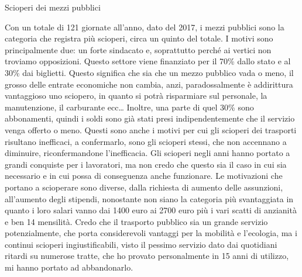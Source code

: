 \documentclass[12pt]{book} %
\begin{document}
\bigskip
\begin{mdframed}[linewidth=1pt]
Scioperi dei mezzi pubblici

Con un totale di 121 giornate all'anno, dato del 2017, i mezzi pubblici sono la categoria che
registra più scioperi, circa un quinto del totale. I motivi sono principalmente due: un forte sindacato e, soprattutto
perché ai vertici non troviamo opposizioni. Questo settore viene finanziato per il 70\% dallo stato e al 30\% dai
biglietti. Questo significa che sia che un mezzo pubblico vada o meno, il grosso delle entrate economiche non cambia,
anzi, paradossalmente è addirittura vantaggioso uno sciopero, in quanto si potrà risparmiare sul personale, la
manutenzione, il carburante ecc… Inoltre, una parte di quel 30\% sono abbonamenti, quindi i soldi sono già stati
presi indipendentemente che il servizio venga offerto o
meno. Questi
sono anche i motivi per cui gli scioperi dei trasporti risultano inefficaci, a confermarlo, sono gli scioperi stessi,
che non accennano a diminuire, riconfermandone l'inefficacia. Gli scioperi negli anni hanno
portato a grandi conquiste per i lavoratori, ma non credo che questo sia il caso in cui sia necessario e in cui possa
di conseguenza anche funzionare. Le motivazioni che portano a scioperare sono diverse, dalla richiesta di aumento delle
assunzioni, all'aumento degli stipendi, nonostante non siano la categoria più svantaggiata in
quanto i loro salari vanno dai 1400 euro ai 2700 euro più i vari scatti di anzianità
e ben 14 mensilità. Credo che il trasporto pubblico sia
un grande servizio potenzialmente, che porta considerevoli vantaggi per la mobilità e l'ecologia,
ma i continui scioperi ingiustificabili, visto il pessimo servizio dato dai quotidiani ritardi su numerose tratte, che
ho provato personalmente in 15 anni di utilizzo, mi hanno portato ad abbandonarlo.


\end{mdframed}
\end{document}
